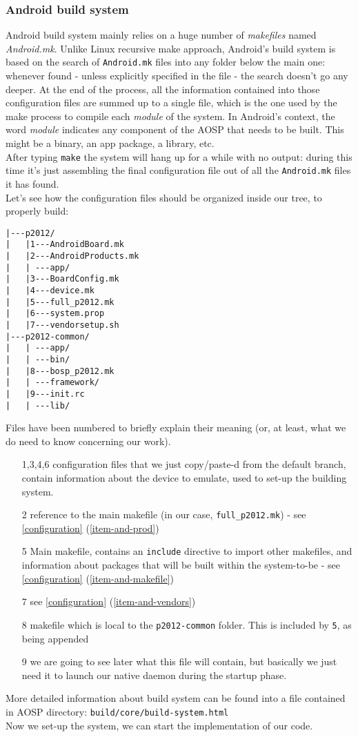 \subsubsection{Android build system}
\label{build-system}
Android build system mainly relies on a huge number of \textit{makefiles} named \textit{Android.mk}. Unlike Linux recursive make approach, Android's build system is based on the search of \texttt{Android.mk} files into any folder below the main one: whenever found - unless explicitly specified in the file - the search doesn't go any deeper. At the end of the process, all the information contained into those configuration files are summed up to a single file, which is the one used by the make process to compile each \textit{module} of the system. In Android's context, the word \textit{module} indicates any component of the AOSP that needs to be built. This might be a binary, an app package, a library, etc.\\
After typing \texttt{make} the system will hang up for a while with no output: during this time it's just assembling the final configuration file out of all the \texttt{Android.mk} files it has found.\\
Let's see how the configuration files should be organized inside our tree, to properly build:
\begin{verbatim}
|---p2012/
|   |1---AndroidBoard.mk
|   |2---AndroidProducts.mk
|   | ---app/
|   |3---BoardConfig.mk
|   |4---device.mk
|   |5---full_p2012.mk
|   |6---system.prop
|   |7---vendorsetup.sh
|---p2012-common/
|   | ---app/
|   | ---bin/
|   |8---bosp_p2012.mk
|   | ---framework/
|   |9---init.rc
|   | ---lib/
\end{verbatim}
Files have been numbered to briefly explain their meaning (or, at least, what we do need to know concerning our work).
\begin{enumerate}
	\item[1,3,4,6] configuration files that we just copy/paste-d from the default branch, contain information about the device to emulate, used to set-up the building system.
	\item[2] reference to the main makefile (in our case, \texttt{full\_p2012.mk}) - see \ref{configuration} (\ref{item-and-prod})
	\item[5] Main makefile, contains an \texttt{include} directive to import other makefiles, and information about packages that will be built within the system-to-be - see \ref{configuration} (\ref{item-and-makefile})
	\item[7] see \ref{configuration} (\ref{item-and-vendors})
	\item[8] makefile which is local to the \texttt{p2012-common} folder. This is included by \texttt{5}, as being appended
	\item[9] we are going to see later what this file will contain, but basically we just need it to launch our native daemon during the startup phase.
\end{enumerate}
More detailed information about build system can be found into a file contained in AOSP directory: \texttt{build/core/build-system.html}\\
Now we set-up the system, we can start the implementation of our code.